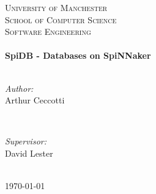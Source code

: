 {\centering

\textsc{\LARGE University of Manchester}\\[1.5cm]
\textsc{\Large School of Computer Science}\\[0.5cm]
\textsc{\large Software Engineering}\\[0.5cm]

\HRule \\[0.4cm]
{ \huge \bfseries SpiDB - Databases on SpiNNaker}\\[0.4cm]
\HRule \\[1.5cm]

\begin{minipage}{0.4\textwidth}
\begin{flushleft} \large
\emph{Author:}\\
Arthur Ceccotti
\end{flushleft}
\end{minipage}
~
\begin{minipage}{0.4\textwidth}
\begin{flushright} \large
\emph{Supervisor:} \\
David Lester
\end{flushright}
\end{minipage}\\[4cm]

{\large \today}\\[3cm]

\vfill

\par
}